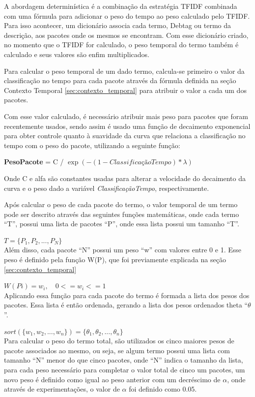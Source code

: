A abordagem determinística é a combinação da estratégia TFIDF combinada com
uma fórmula para adicionar o peso do tempo ao peso calculado pelo TFIDF. Para
isso acontecer, um dicionário associa cada termo, Debtag ou termo da
descrição, aos pacotes onde os mesmos se encontram. Com esse dicionário criado,
no momento que o TFIDF for calculado, o peso temporal do termo também é
calculado e seus valores são enfim multiplicados.

Para calcular o peso temporal de um dado termo, calcula-se primeiro o valor da
classificação no tempo para cada pacote através da fórmula definida na seção
Contexto Temporal \ref{sec:contexto_temporal} para atribuir o valor
a cada um dos pacotes.

Com esse valor calculado, é necessário atribuir mais peso para pacotes que
foram recentemente usados, sendo assim é usado uma função de decaimento
exponencial para obter controle quanto à suavidade da curva que relaciona
a classificação no tempo com o peso do pacote, utilizando a seguinte função:

\textbf{PesoPacote} = C / $\exp\left(-({1 - ClassificaçãoTempo}) * {\lambda}\right)$

Onde C e alfa são constantes usadas para alterar a velocidade do decaimento da
curva e o peso dado a variável \textit{ClassificaçãoTempo}, respectivamente.

Após calcular o peso de cada pacote do termo, o valor temporal de um termo pode ser
descrito através das seguintes funções matemáticas, onde cada termo ``T'', possui uma
lista de pacotes ``P'', onde essa lista possui um tamanho ``T''.

$T = \{P_1, P_2, ..., P_N\}$
\\

Além disso, cada pacote ``N'' possui um peso ``w'' com valores entre 0 e 1. Esse peso
é definido pela função W(P), que foi previamente explicada na seção
\ref{sec:contexto_temporal}

$W(Pi) = w_i , \quad 0 <= w_i <= 1$
\\

Aplicando essa função para cada pacote do termo é formada a lista dos pesos
dos pacotes. Essa lista é então ordenada, gerando a lista
dos pesos ordenados theta ``$\theta$''.

$sort(\{w_1, w_2, ..., w_n\}) = \{\theta_1, \theta_2, ..., \theta_n\}$
\\

Para calcular o peso do termo total, são utilizados os cinco maiores pesos de pacote
associados ao mesmo, ou seja, se algum termo possui uma lista com tamanho ``N''
menor do que cinco pacotes, onde ``N'' indica o tamanho da lista, para cada peso
necessário para completar o valor total de cinco um pacotes, um novo peso
é definido como igual ao peso anterior com um decréscimo de $\alpha$, onde
através de experimentações, o valor de $\alpha$ foi definido como 0.05.

